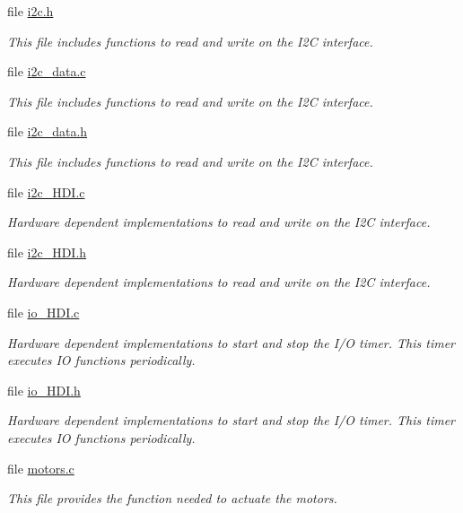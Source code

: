 \begin{DoxyCompactItemize}
file \hyperlink{i2c_8h}{i2c.\+h}
\begin{DoxyCompactList}\small\item\em This file includes functions to read and write on the I2\+C interface. \end{DoxyCompactList}\item 
file \hyperlink{i2c__data_8c}{i2c\+\_\+data.\+c}
\begin{DoxyCompactList}\small\item\em This file includes functions to read and write on the I2\+C interface. \end{DoxyCompactList}\item 
file \hyperlink{i2c__data_8h}{i2c\+\_\+data.\+h}
\begin{DoxyCompactList}\small\item\em This file includes functions to read and write on the I2\+C interface. \end{DoxyCompactList}\item 
file \hyperlink{i2c__HDI_8c}{i2c\+\_\+\+H\+D\+I.\+c}
\begin{DoxyCompactList}\small\item\em Hardware dependent implementations to read and write on the I2\+C interface. \end{DoxyCompactList}\item 
file \hyperlink{i2c__HDI_8h}{i2c\+\_\+\+H\+D\+I.\+h}
\begin{DoxyCompactList}\small\item\em Hardware dependent implementations to read and write on the I2\+C interface. \end{DoxyCompactList}\item 
file \hyperlink{io__HDI_8c}{io\+\_\+\+H\+D\+I.\+c}
\begin{DoxyCompactList}\small\item\em Hardware dependent implementations to start and stop the I/\+O timer. This timer executes I\+O functions periodically. \end{DoxyCompactList}\item 
file \hyperlink{io__HDI_8h}{io\+\_\+\+H\+D\+I.\+h}
\begin{DoxyCompactList}\small\item\em Hardware dependent implementations to start and stop the I/\+O timer. This timer executes I\+O functions periodically. \end{DoxyCompactList}\item 
file \hyperlink{motors_8c}{motors.\+c}
\begin{DoxyCompactList}\small\item\em This file provides the function needed to actuate the motors. \end{DoxyCompactList}\item 

\end{DoxyCompactItemize}
